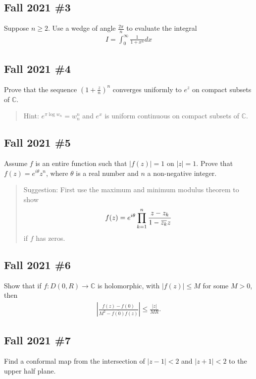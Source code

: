 \hypertarget{fall-2021-3}{%
\subsection{Fall 2021 \#3}\label{fall-2021-3}}

Suppose \(n \geq 2\). Use a wedge of angle \(\frac{2 \pi}{n}\) to
evaluate the integral
\begin{align*}
I=\int_{0}^{\infty} \frac{1}{1+x^{n}} d x
\end{align*}

\hypertarget{fall-2021-4}{%
\subsection{Fall 2021 \#4}\label{fall-2021-4}}

Prove that the sequence \(\left(1+\frac{z}{n}\right)^{n}\) converges
uniformly to \(e^{z}\) on compact subsets of \(\mathbb{C}\).

\begin{quote}
Hint: \(e^{\pi \log w_{n}}=w_{n}^{n}\) and \(e^{x}\) is uniform
continuous on compact subsets of \(\mathbb{C}\).
\end{quote}

\hypertarget{fall-2021-5}{%
\subsection{Fall 2021 \#5}\label{fall-2021-5}}

Assume \(f\) is an entire function such that \(|f(z)|=1\) on \(|z|=1\).
Prove that \(f(z)=e^{i \theta} z^{n}\), where \(\theta\) is a real
number and \(n\) a non-negative integer.

\begin{quote}
Suggestion: First use the maximum and minimum modulus theorem to show
\begin{align*}f(z)=e^{i \theta} \prod_{k=1}^{n} \frac{z-z_{k}}{1-\mkern 1.5mu\overline{\mkern-1.5muz_{k}\mkern-1.5mu}\mkern 1.5mu z}\end{align*}
if \(f\) has zeros.
\end{quote}

\hypertarget{fall-2021-6}{%
\subsection{Fall 2021 \#6}\label{fall-2021-6}}

Show that if \(f: D(0, R) \rightarrow \mathbb{C}\) is holomorphic, with
\(|f(z)| \leq M\) for some \(M>0\), then
\begin{align*}
\left|\frac{f(z)-f(0)}{M^{2}-\overline{f(0)} f(z)}\right| \leq \frac{|z|}{M R} .
\end{align*}

\hypertarget{fall-2021-7}{%
\subsection{Fall 2021 \#7}\label{fall-2021-7}}

Find a conformal map from the intersection of \(|z-1|<2\) and
\(|z+1|<2\) to the upper half plane.


\printbibliography[title=Bibliography]



